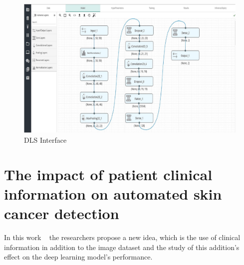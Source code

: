\begin{figure}[htbp]
\begin{center}
\includegraphics[width=12cm]{./chapter-03-state-of-the-art/dls.png}
\end{center}
\caption{DLS Interface}
\label{fig:dls}
\end{figure}





\section{The impact of patient clinical information on automated skin cancer detection}
In this work ~\cite{Pacheco2020} the researchers propose a new idea, which is the use  of clinical information in addition to the image dataset and the study of this addition's effect on the deep learning model's performance.

